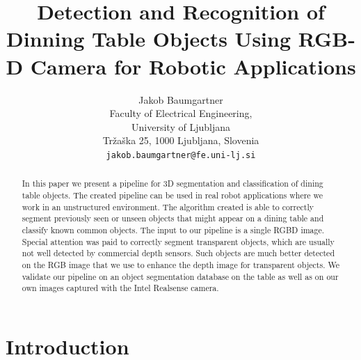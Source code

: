 \documentclass[10pt,twocolumn,letterpaper]{article}
\begin{document}
\title{Detection and Recognition of Dinning Table Objects Using RGB-D Camera for Robotic Applications}

\author{Jakob Baumgartner\\
Faculty of Electrical Engineering,\\
University of Ljubljana\\
Tržaška 25, 1000 Ljubljana, Slovenia\\
{\tt\small jakob.baumgartner@fe.uni-lj.si}
}

\maketitle
\ificcvfinal\thispagestyle{empty}\fi

\begin{abstract}
In this paper we present a pipeline for 3D segmentation and classification of dining table objects. The created pipeline can be used in real robot applications where we work in an unstructured environment. The algorithm created is able to correctly segment previously seen or unseen objects that might appear on a dining table and classify known common objects. The input to our pipeline is a single RGBD image. Special attention was paid to correctly segment transparent objects, which are usually not well detected by commercial depth sensors. Such objects are much better detected on the RGB image that we use to enhance the depth image for transparent objects. We validate our pipeline on an object segmentation database on the table as well as on our own images captured with the Intel Realsense camera.
\end{abstract}

\section{Introduction}
\end{document}
